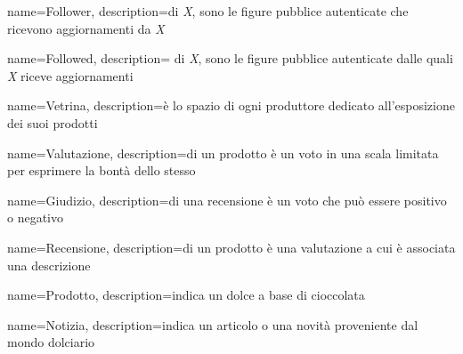 {
    name={Follower},
    description={di \emph{X}, sono le figure pubblice autenticate che ricevono aggiornamenti da \emph{X}}
}

{
    name={Followed},
    description={ di \emph{X}, sono le figure pubblice autenticate dalle quali \emph{X} riceve aggiornamenti}
}

{
    name={Vetrina},
    description={è lo spazio di ogni produttore dedicato all'esposizione dei suoi prodotti}
}

{
    name={Valutazione},
    description={di un prodotto è un voto in una scala limitata per esprimere la bontà dello stesso}
}

{
    name={Giudizio},
    description={di una recensione è un voto che può essere positivo o negativo}
}

{
    name={Recensione},
    description={di un prodotto è una valutazione a cui è associata una descrizione}
}

{
    name={Prodotto},
    description={indica un dolce a base di cioccolata}
}

{
    name={Notizia},
    description={indica un articolo o una novità proveniente dal mondo dolciario}
}


